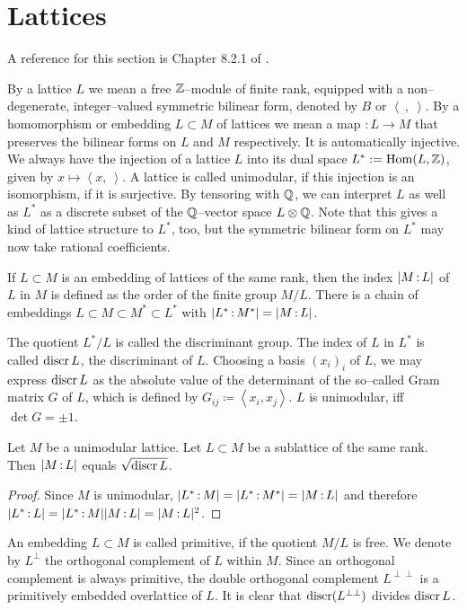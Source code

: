 

\section{Lattices}\label{latticeSubsection}A reference for this section is Chapter 8.2.1 of \cite{Dolgachev}. 
\begin{definition}
By a lattice $L$ we mean a free $\mathbb{Z}$--module of finite rank, equipped with a non--degenerate, integer--valued symmetric bilinear form, denoted by $B$ or $\left<\ ,\;\right>$. 
By a homomorphism or embedding $L\subset M$ of lattices we mean a map $:L\rightarrow M$ that preserves the bilinear forms on $L$ and $M$ respectively. It is automatically injective. We always have the injection of a lattice $L$ into its dual space $L^*:= \operatorname{Hom}(L,\mathbb{Z})$, given by $x \mapsto \left<x,\ \right>$. A lattice is called unimodular, if this injection is an isomorphism, \ie if it is surjective. By tensoring with $\mathbb{Q}$, we can interpret $L$ as well as $L^*$ as a discrete subset of the $\mathbb{Q}$--vector space $L\otimes \mathbb{Q}$. Note that this gives a kind of lattice structure to $L^*$, too, but the symmetric bilinear form on $L^*$ may now take rational coefficients.


If $L\subset M$ is an embedding of lattices of the same rank, then the index $|M\,{:}\, L|$ of $L$ in $M$ is defined as the order of the finite group $M/L$.
There is a chain of embeddings $L\subset M \subset M^* \subset L^*$ with $|L^*\,{:}\, M^*| =|M\,{:}\, L| $.

The quotient $L^*/L$ is called the discriminant group. The index of $L$ in $L^*$ is called $\operatorname{discr} L$, the discriminant of $L$.
Choosing a basis $(x_i)_i$ of $L$, we may express $\operatorname{discr} L$ as the absolute value of the determinant of the so--called Gram matrix $G$ of $L$, which is defined by $G_{ij}\coloneqq \left<x_i,x_j\right>$. $L$ is unimodular, iff $\det G =\pm 1$.
\end{definition}
\begin{proposition} \label{squareDiscr}Let $M$ be a unimodular lattice. Let $L\subset M$ be a sublattice of the same rank. Then $|M\,{:}\, L|$ equals $\sqrt{\operatorname{discr} L}$.
\end{proposition}
\begin{proof}
Since $M$ is unimodular, $|L^*\,{:}\, M|=|L^*\,{:}\, M^*| =|M\,{:}\, L| $ and therefore $|L^*\,{:}\, L| = |L^*\,{:}\, M||M\,{:}\, L|  = |M\,{:}\, L|^2$.
\end{proof}
An embedding $L\subset M$ is called primitive, if the quotient $M/L$ is free. We denote by $L^\perp$ the orthogonal complement of $L$ within $M$. Since an orthogonal complement is always primitive, the double orthogonal complement $ L^{\perp\perp}$ is a primitively embedded overlattice of $L$. It is clear that $\operatorname{discr}( L^{\perp\perp})$ divides $\operatorname{discr} L$. 
